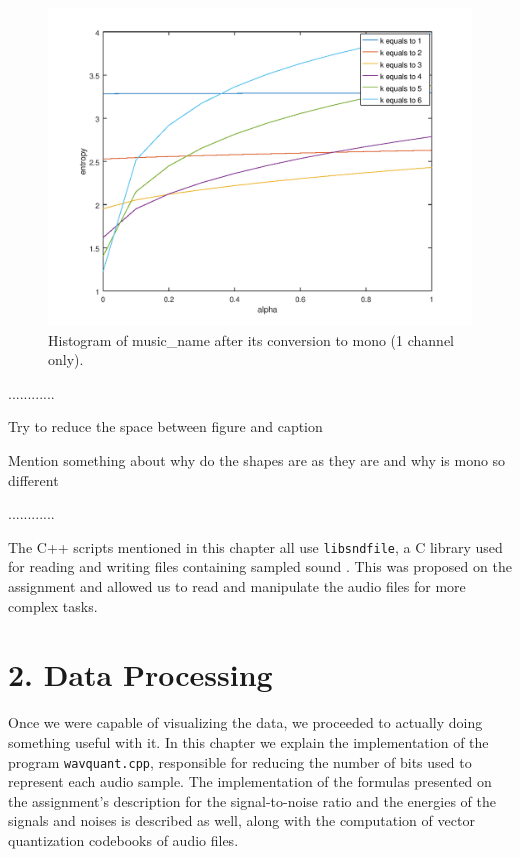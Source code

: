 \documentclass[12pt]{article}
\begin{document}
\begin{figure}[H]
  \centering
  \begin{minipage}{.5\textwidth}
    \centering
    \includegraphics[width=\linewidth]{bible_en.png}
  \end{minipage}%
  \caption{{Histogram of music\_name after its conversion to mono (1 channel only).}}
  \label{fig:histogram_mono}
\end{figure}

............

Try to reduce the space between figure and caption

Mention something about why do the shapes are as they are and why is mono so different

............

The C++ scripts mentioned in this chapter all use \texttt{libsndfile}, a C 
library used for reading and writing files containing sampled sound \cite{libsndfile}.
This was proposed on the assignment and allowed us to read and manipulate the 
audio files for more complex tasks.

\newpage
\section*{2. Data Processing}

Once we were capable of visualizing the data, we proceeded to actually doing 
something useful with it.
In this chapter we explain the implementation of the program \texttt{wavquant.cpp},
responsible for reducing the number of bits used to represent each audio sample.
The implementation of the formulas presented on the assignment's description for
the signal-to-noise ratio and the energies of the signals and noises is described
as well, along with the computation of vector quantization codebooks of audio files.
\end{document}
